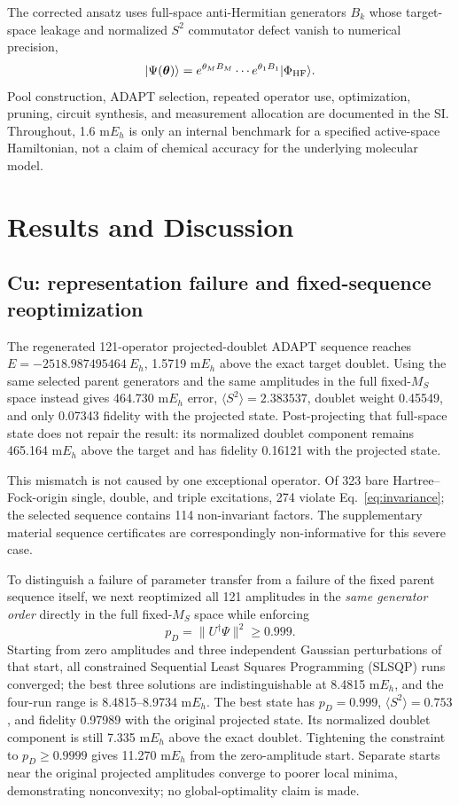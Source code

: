 \documentclass[
 aip,
 jcp,
 amsmath,amssymb,
 preprint
]{revtex4-2}
\begin{document}
The corrected ansatz uses full-space anti-Hermitian generators $B_k$ whose target-space leakage and normalized $S^2$ commutator defect vanish to numerical precision,
\begin{equation}
|\Psi(\boldsymbol\theta)\rangle
=
e^{\theta_M B_M}\cdots e^{\theta_1B_1}|\Phi_{\rm HF}\rangle.
\end{equation}
Pool construction, ADAPT selection, repeated operator use, optimization, pruning, circuit synthesis, and measurement allocation are documented in the SI.
Throughout, 1.6 m$E_h$ is only an internal benchmark for a specified active-space Hamiltonian, not a claim of chemical accuracy for the underlying molecular model.

\section{Results and Discussion}

\subsection{Cu: representation failure and fixed-sequence reoptimization}

The regenerated 121-operator projected-doublet ADAPT sequence reaches
$E=-2518.987495464~E_h$, 1.5719 m$E_h$ above the exact target doublet.
Using the same selected parent generators and the same amplitudes in the full fixed-$M_S$ space instead gives 464.730 m$E_h$ error, $\langle S^2\rangle=2.383537$, doublet weight 0.45549, and only 0.07343 fidelity with the projected state.
Post-projecting that full-space state does not repair the result: its normalized doublet component remains 465.164 m$E_h$ above the target and has fidelity 0.16121 with the projected state.

This mismatch is not caused by one exceptional operator.
Of 323 bare Hartree--Fock-origin single, double, and triple excitations, 274 violate Eq.~\ref{eq:invariance}; the selected sequence contains 114 non-invariant factors.
The supplementary material sequence certificates are correspondingly non-informative for this severe case.

To distinguish a failure of parameter transfer from a failure of the fixed parent sequence itself, we next reoptimized all 121 amplitudes in the \emph{same generator order} directly in the full fixed-$M_S$ space while enforcing
\begin{equation}
p_D=\|U^\dagger\Psi\|^2\ge0.999.
\label{eq:hardspin}
\end{equation}
Starting from zero amplitudes and three independent Gaussian perturbations of that start, all constrained Sequential Least Squares Programming (SLSQP) runs converged; the best three solutions are indistinguishable at 8.4815 m$E_h$, and the four-run range is 8.4815--8.9734 m$E_h$.
The best state has $p_D=0.999$, $\langle S^2\rangle=0.753$, and fidelity 0.97989 with the original projected state.
Its normalized doublet component is still 7.335 m$E_h$ above the exact doublet.
Tightening the constraint to $p_D\ge0.9999$ gives 11.270 m$E_h$ from the zero-amplitude start.
Separate starts near the original projected amplitudes converge to poorer local minima, demonstrating nonconvexity; no global-optimality claim is made.
\end{document}
